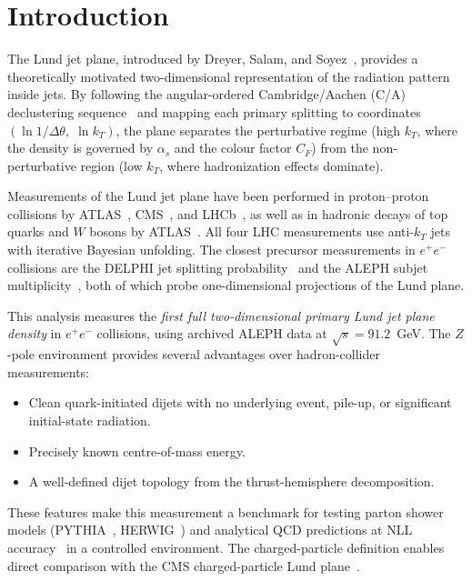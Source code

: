 \documentclass[11pt,a4paper]{article}
\begin{document}
\clearpage

\section{Introduction}
\label{sec:intro}

The Lund jet plane, introduced by Dreyer, Salam, and
Soyez~\cite{Dreyer:2018nbf}, provides a theoretically motivated
two-dimensional representation of the radiation pattern inside jets.
By following the angular-ordered Cambridge/Aachen (C/A)
declustering sequence~\cite{Dokshitzer:1997in} and mapping each
primary splitting to coordinates
$(\ln 1/\Delta\theta,\;\ln k_T)$, the plane separates the
perturbative regime (high $k_T$, where the density is governed by
$\alpha_s$ and the colour factor $C_F$) from the non-perturbative
region (low $k_T$, where hadronization effects dominate).

Measurements of the Lund jet plane have been performed in
proton--proton collisions by
ATLAS~\cite{ATLAS:2020bbn},
CMS~\cite{CMS:2024mlf},
and LHCb~\cite{LHCb:2025viq},
as well as in hadronic decays of top quarks and $W$ bosons by
ATLAS~\cite{ATLAS:2024wqo}.
All four LHC measurements use anti-$k_T$ jets with iterative
Bayesian unfolding.  The closest precursor measurements in
$e^+e^-$ collisions are the DELPHI jet splitting
probability~\cite{DELPHI:2003yqh} and the ALEPH subjet
multiplicity~\cite{ALEPH:1998hhp}, both of which probe
one-dimensional projections of the Lund plane.

This analysis measures the \emph{first full two-dimensional primary
Lund jet plane density} in $e^+e^-$ collisions, using archived
ALEPH data at $\sqrt{s} = 91.2$~GeV.  The $Z$-pole environment
provides several advantages over hadron-collider measurements:
\begin{itemize}
\item Clean quark-initiated dijets with no underlying event, pile-up,
  or significant initial-state radiation.
\item Precisely known centre-of-mass energy.
\item A well-defined dijet topology from the thrust-hemisphere
  decomposition.
\end{itemize}
These features make this measurement a benchmark for testing parton
shower models (PYTHIA~\cite{Sjostrand:2014zea,Skands:2014pea},
HERWIG~\cite{Bellm:2015jjp}) and analytical QCD predictions at NLL
accuracy~\cite{Lifson:2020gua} in a controlled environment.  The
charged-particle definition enables direct comparison with the CMS
charged-particle Lund plane~\cite{CMS:2024mlf}.
\end{document}
